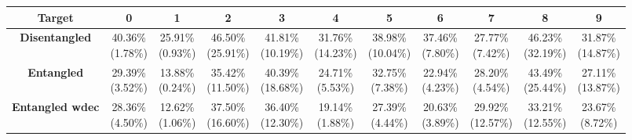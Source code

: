 \documentclass{report}
\begin{document}
\begin{center}
{\tiny
  \begin{tabular}{|c|c|c|c|c|c|c|c|c|c|c|}
  \hline
  \textbf{Target} & \textbf{0} & \textbf{1} & \textbf{2} & \textbf{3} & \textbf{4} & \textbf{5} & \textbf{6} & \textbf{7} & \textbf{8} & \textbf{9}  \\ \hline
  \textbf{Disentangled} & \cellcolor{light-gray} \makecell{40.36\% \\ (1.78\%)} &  \cellcolor{light-gray} \makecell{25.91\% \\ (0.93\%)} &  \cellcolor{light-gray} \makecell{46.50\% \\ (25.91\%)} & \cellcolor{light-gray} \makecell{41.81\% \\ (10.19\%)} & \cellcolor{light-gray} \makecell{31.76\% \\ (14.23\%)} & \cellcolor{light-gray} \makecell{38.98\% \\ (10.04\%)} & \cellcolor{light-gray} \makecell{37.46\% \\ (7.80\%)} & \makecell{27.77\% \\ (7.42\%)} & \cellcolor{light-gray} \makecell{46.23\% \\ (32.19\%)} & \cellcolor{light-gray} \makecell{31.87\% \\ (14.87\%)} \\ \hline
  \textbf{Entangled} & \makecell{29.39\% \\ (3.52\%)} & \makecell{13.88\% \\ (0.24\%)} & \makecell{35.42\% \\ (11.50\%)} & \makecell{40.39\% \\ (18.68\%)} & \makecell{24.71\% \\ (5.53\%)} & \makecell{32.75\% \\ (7.38\%)} & \makecell{22.94\% \\ (4.23\%)} & \cellcolor{light-gray} \makecell{28.20\% \\ (4.54\%)} & \makecell{43.49\% \\ (25.44\%)} & \makecell{27.11\% \\ (13.87\%)} \\ \hline
  \textbf{Entangled wdec} & \makecell{28.36\% \\ (4.50\%)} & \makecell{12.62\% \\ (1.06\%)} & \makecell{37.50\% \\ (16.60\%)} & \makecell{36.40\% \\ (12.30\%)} & \makecell{19.14\% \\ (1.88\%)} & \makecell{27.39\% \\ (4.44\%)} & \makecell{20.63\% \\ (3.89\%)} & \makecell{29.92\% \\ (12.57\%)} & \makecell{33.21\% \\ (12.55\%)} & \makecell{23.67\% \\ (8.72\%)} \\ \hline
  \end{tabular}
}
\end{center}
\end{document}
